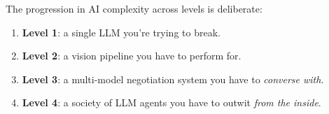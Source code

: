 \documentclass[11pt,a4paper]{article}
\begin{document}
The progression in AI complexity across levels is deliberate:
\begin{enumerate}[leftmargin=*,itemsep=2pt]
    \item \textbf{Level 1}: a single LLM you're trying to break.
    \item \textbf{Level 2}: a vision pipeline you have to perform for.
    \item \textbf{Level 3}: a multi-model negotiation system you have to
    \emph{converse with}.
    \item \textbf{Level 4}: a society of LLM agents you have to outwit
    \emph{from the inside}.
\end{enumerate}
\end{document}
